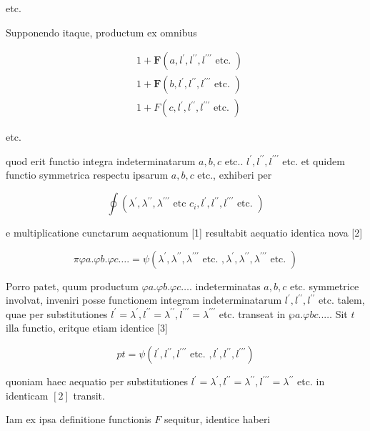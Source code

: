 \documentclass[10pt]{article}
\begin{document}
etc.

Supponendo itaque, productum ex omnibus

\[
\begin{aligned}
& 1+\boldsymbol{F}\left(a, l^{\prime}, l^{\prime \prime}, l^{\prime \prime \prime} \text { etc. }\right) \\
& 1+\boldsymbol{F}\left(b, l^{\prime}, l^{\prime \prime}, l^{\prime \prime \prime} \text { etc. }\right) \\
& 1+F\left(c, l^{\prime}, l^{\prime \prime}, l^{\prime \prime \prime} \text { etc. }\right)
\end{aligned}
\]

etc.

quod erit functio integra indeterminatarum \(a, b, c\) etc.. \(l^{\prime}, l^{\prime \prime}, l^{\prime \prime \prime}\) etc. et quidem functio symmetrica respectu ipsarum \(a, b, c\) etc., exhiberi per

\[
\oint\left(\lambda^{\prime}, \lambda^{\prime \prime}, \lambda^{\prime \prime \prime} \text { etc } c_{i}, l^{\prime}, l^{\prime \prime}, l^{\prime \prime \prime} \text { etc. }\right)
\]

e multiplicatione cunctarum aequationum [1] resultabit aequatio identica nova [2]

\[
\pi \varphi a . \varphi b . \varphi c \ldots .=\psi\left(\lambda^{\prime}, \lambda^{\prime \prime}, \lambda^{\prime \prime \prime} \text { etc. }, \lambda^{\prime}, \lambda^{\prime \prime}, \lambda^{\prime \prime \prime} \text { etc. }\right)
\]

Porro patet, quum productum \(\varphi a . \varphi b . \varphi c \ldots\). indeterminatas \(a, b, c\) etc. symmetrice involvat, inveniri posse functionem integram indeterminatarum \(l^{\prime}, l^{\prime \prime}, l^{\prime \prime}\) etc. talem, quae per substitutiones \(l^{\prime}=\lambda^{\prime}, l^{\prime \prime}=\lambda^{\prime \prime}, l^{\prime \prime \prime}=\lambda^{\prime \prime \prime}\) etc. transeat in \(\wp a . \varphi b c . . \ldots\) Sit \(t\) illa functio, eritque etiam identice [3]

\[
p t=\psi\left(l^{\prime}, l^{\prime \prime}, l^{\prime \prime \prime} \text { etc. }, l^{\prime}, l^{\prime \prime}, l^{\prime \prime \prime}\right)
\]

quoniam haec aequatio per substitutiones \(l^{\prime}=\lambda^{\prime}, l^{\prime \prime}=\lambda^{\prime \prime}, l^{\prime \prime \prime}=\lambda^{\prime \prime}\) etc. in identicam \([2]\) transit.

Iam ex ipsa definitione functionis \(F\) sequitur, identice haberi
\end{document}
